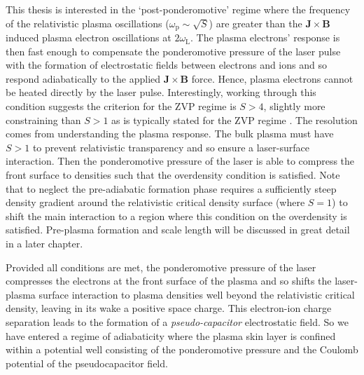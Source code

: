 This thesis is interested in the `post-ponderomotive' regime where the frequency of the relativistic plasma oscillations ($\omega_\mathrm{p} \sim \sqrt{S}$) are greater than the $\mathbf{J}\times \mathbf{B}$ induced plasma electron oscillations at $2\omega_\mathrm{L}$. The plasma electrons' response is then fast enough to compensate the ponderomotive pressure of the laser pulse with the formation of electrostatic fields between electrons and ions and so respond adiabatically to the applied $\mathbf{J}\times \mathbf{B}$ force. Hence, plasma electrons cannot be heated directly by the laser pulse. Interestingly, working through this condition suggests the criterion for the \ac{ZVP} regime is $S > 4$, slightly more constraining than $S>1$ as is typically stated for the \ac{ZVP} regime \cite{savinModellingLaserPlasmaInteractions2019}. The resolution comes from understanding the plasma response. The bulk plasma must have $S>1$ to prevent relativistic transparency and so ensure a laser-surface interaction. Then the ponderomotive pressure of the laser is able to compress the front surface to densities such that the overdensity condition is satisfied. Note that to neglect the pre-adiabatic formation phase requires a sufficiently steep density gradient around the relativistic critical density surface (where $S=1$) to shift the main interaction to a region where this condition on the overdensity is satisfied. Pre-plasma formation and scale length will be discussed in great detail in a later chapter.

Provided all conditions are met, the ponderomotive pressure of the laser compresses the electrons at the front surface of the plasma and so shifts the laser-plasma surface interaction to plasma densities well beyond the relativistic critical density, leaving in its wake a positive space charge. This electron-ion charge separation leads to the formation of a \textit{pseudo-capacitor} electrostatic field. So we have entered a regime of adiabaticity where the plasma skin layer is confined within a potential well consisting of the ponderomotive pressure and the Coulomb potential of the pseudocapacitor field.

